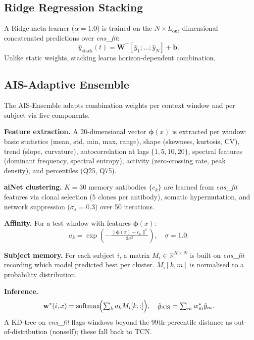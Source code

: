 \documentclass[conference]{IEEEtran}
\newcommand{\Lout}{L_{\mathrm{out}}}
\begin{document}
\subsection{Ridge Regression Stacking}
A Ridge meta-learner ($\alpha=1.0$) is trained on the
$N{\times}\Lout$-dimensional concatenated predictions over \textit{ens\_fit}:
\begin{equation}
  \hat{y}_{\mathrm{stack}}(t)=
  \mathbf{W}^{\!\top}\![\hat{y}_1;\ldots;\hat{y}_N]+\mathbf{b}.
\end{equation}
Unlike static weights, stacking learns horizon-dependent combination.

\subsection{AIS-Adaptive Ensemble}
The AIS-Ensemble adapts combination weights per context window and per subject
via five components.

\textbf{Feature extraction.} A 20-dimensional vector $\boldsymbol{\phi}(x)$
is extracted per window: basic statistics (mean, std, min, max, range), shape
(skewness, kurtosis, CV), trend (slope, curvature), autocorrelation at lags
$\{1,5,10,20\}$, spectral features (dominant frequency, spectral entropy),
activity (zero-crossing rate, peak density), and percentiles (Q25, Q75).

\textbf{aiNet clustering.} $K=30$ memory antibodies $\{c_k\}$ are learned from
\textit{ens\_fit} features via clonal selection (5 clones per antibody),
somatic hypermutation, and network suppression ($\sigma_s=0.3$) over 50
iterations.

\textbf{Affinity.} For a test window with features $\boldsymbol{\phi}(x)$:
\begin{equation}
  a_k = \exp\!\left(-\tfrac{\|\boldsymbol{\phi}(x)-c_k\|^2}{2\sigma^2}\right),
  \quad\sigma=1.0.
\end{equation}

\textbf{Subject memory.} For each subject $i$, a matrix $M_i\in\mathbb{R}^{K\times N}$
is built on \textit{ens\_fit} recording which model predicted best per cluster.
$M_i[k,m]$ is normalised to a probability distribution.

\textbf{Inference.}
\begin{equation}
  \mathbf{w}^*(i,x)=\operatorname{softmax}\!\Bigl(\textstyle\sum_k a_k M_i[k,:]\Bigr),
  \quad
  \hat{y}_{\mathrm{AIS}}=\textstyle\sum_m w^*_m\hat{y}_m.
\end{equation}
A KD-tree on \textit{ens\_fit} flags windows beyond the 99th-percentile
distance as out-of-distribution (nonself); these fall back to TCN.
\end{document}
